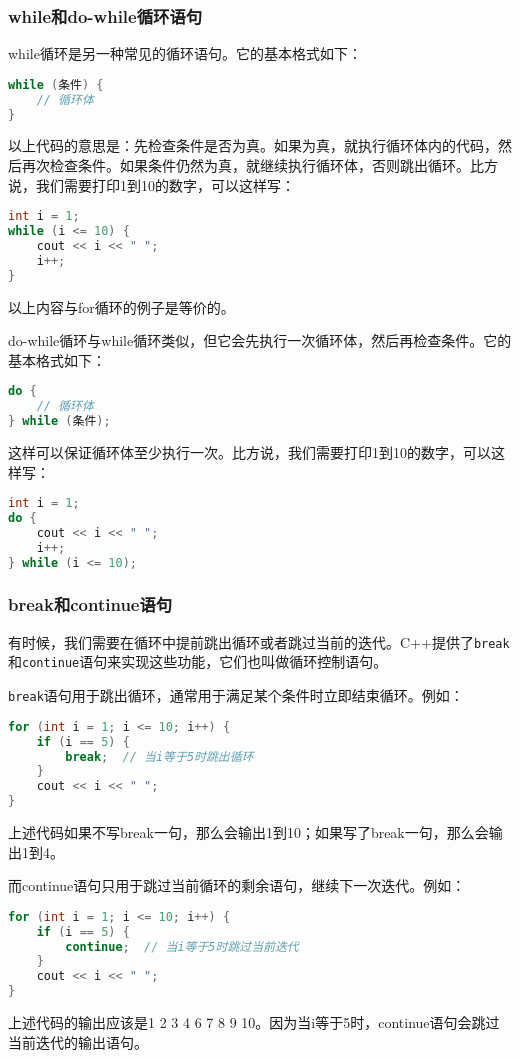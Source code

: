 \subsubsection{while和do-while循环语句}
while循环是另一种常见的循环语句。它的基本格式如下：
\begin{lstlisting}[language=C++]
while (条件) {
    // 循环体
}
\end{lstlisting}
以上代码的意思是：先检查条件是否为真。如果为真，就执行循环体内的代码，然后再次检查条件。如果条件仍然为真，就继续执行循环体，否则跳出循环。比方说，我们需要打印1到10的数字，可以这样写：
\begin{lstlisting}[language=C++]
int i = 1;
while (i <= 10) {
    cout << i << " ";
    i++;
}
\end{lstlisting}
以上内容与for循环的例子是等价的。

do-while循环与while循环类似，但它会先执行一次循环体，然后再检查条件。它的基本格式如下：
\begin{lstlisting}[language=C++]
do {
    // 循环体
} while (条件);
\end{lstlisting}
这样可以保证循环体至少执行一次。比方说，我们需要打印1到10的数字，可以这样写：
\begin{lstlisting}[language=C++]
int i = 1;
do {
    cout << i << " ";
    i++;
} while (i <= 10);
\end{lstlisting}

\subsubsection{break和continue语句}

有时候，我们需要在循环中提前跳出循环或者跳过当前的迭代。C++提供了\texttt{break}和\texttt{continue}语句来实现这些功能，它们也叫做循环控制语句。

\texttt{break}语句用于跳出循环，通常用于满足某个条件时立即结束循环。例如：
\begin{lstlisting}[language=C++]
for (int i = 1; i <= 10; i++) {
    if (i == 5) {
        break;  // 当i等于5时跳出循环
    }
    cout << i << " ";
}
\end{lstlisting}
上述代码如果不写break一句，那么会输出1到10；如果写了break一句，那么会输出1到4。

而continue语句只用于跳过当前循环的剩余语句，继续下一次迭代。例如：
\begin{lstlisting}[language=C++]
for (int i = 1; i <= 10; i++) {
    if (i == 5) {
        continue;  // 当i等于5时跳过当前迭代
    }
    cout << i << " ";
}
\end{lstlisting}
上述代码的输出应该是1 2 3 4 6 7 8 9 10。因为当i等于5时，continue语句会跳过当前迭代的输出语句。


